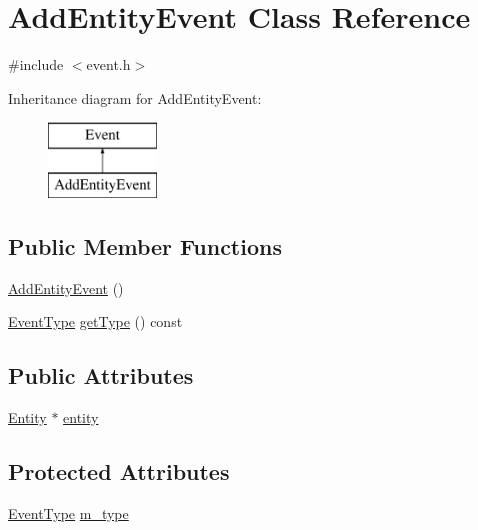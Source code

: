 \hypertarget{classAddEntityEvent}{\section{Add\-Entity\-Event Class Reference}
\label{classAddEntityEvent}
}


{\ttfamily \#include $<$event.\-h$>$}

Inheritance diagram for Add\-Entity\-Event\-:\begin{figure}[H]
\begin{center}
\leavevmode
\includegraphics[height=2.000000cm]{classAddEntityEvent}
\end{center}
\end{figure}
\subsection*{Public Member Functions}
\begin{DoxyCompactItemize}
\item 
\hyperlink{classAddEntityEvent_aa173c0bf3732483470f73beb61461eb9}{Add\-Entity\-Event} ()
\item 
\hyperlink{event_8h_a2628ea8d12e8b2563c32f05dc7fff6fa}{Event\-Type} \hyperlink{classEvent_ab0c2e30730d5859851f3126258c0126e}{get\-Type} () const 
\end{DoxyCompactItemize}
\subsection*{Public Attributes}
\begin{DoxyCompactItemize}
\item 
\hyperlink{classEntity}{Entity} $\ast$ \hyperlink{classAddEntityEvent_a2c6f03064f943f33a2db0bf1438b0f93}{entity}
\end{DoxyCompactItemize}
\subsection*{Protected Attributes}
\begin{DoxyCompactItemize}
\item 
\hyperlink{event_8h_a2628ea8d12e8b2563c32f05dc7fff6fa}{Event\-Type} \hyperlink{classEvent_a38264e3fb229dc64123dff1d5a7dcf9e}{m\-\_\-type}
\end{DoxyCompactItemize}


